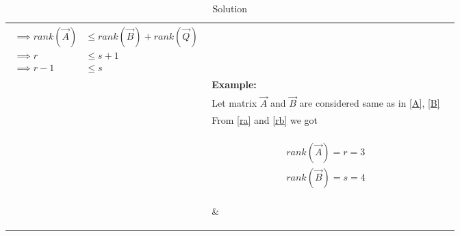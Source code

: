 \documentclass[journal,12pt]{IEEEtran}
\begin{document}
\begin{longtable}{|l|l|l|}
{\begin{align}
    \implies rank(\vec{A})&\leq rank(\vec{B})+rank(\vec{Q})\\
    \implies r&\leq s+1\\
    \implies r-1&\leq s\label{p2}
\end{align}}&\\&\textbf{Example:}&\\&Let matrix $\vec{A}$ and $\vec{B}$ are considered same as in \eqref{A}, \eqref{B}&\\&From \eqref{ra} and \eqref{rb} we got&\\&\parbox{14cm}{\begin{align}
    rank(\vec{A})=r=3\\
    rank(\vec{B})=s=4\\
\end{align}}&\\&Here matrix $\vec{Q}$ will be&\\&\parbox{14cm}{\begin{align}
    \vec{Q}&=\vec{A}-\vec{B}\\
    \implies\vec{Q}&=\myvec{0&0&0&0&0\\0&0&0&0&-8\\0&0&0&0&0\\0&0&0&0&0\\0&0&0&0&0}\implies\vec{Q}=-\vec{P}\\
    \implies rank(\vec{Q})&=1
\end{align}}&\\&Now we will see equation \eqref{p2} is satisfied or not&\\&\parbox{14cm}{\begin{align}
    r-1\leq s\implies3-1\leq4\implies2\leq4
\end{align}}&\\&Hence satisfied&\\
.&Let matrix $\vec{A}$ be identity matrix then $rank(\vec{A})$ is 5 and matrix $\vec{B}$ can be&\\&\parbox{14cm}{\begin{align}
    \vec{A}=\vec{I}_{5\times5}\label{eq1}\\
    \vec{B}=\myvec{1&1&0&0&0\\0&1&0&0&0\\0&0&1&0&0\\0&0&0&1&0\\0&0&0&0&1}\label{eq2}
\end{align}}&False\\&Then $rank(\vec{B})$ is also 5.Therefore $s=r-1$ is always not true.&\\
.&Similarly from \eqref{eq1},\eqref{eq2} we can say that $s\neq r$ is not true always.&False\\&&\\
\hline
\caption{Solution}
\label{deftab}
\end{longtable}
\end{document}
